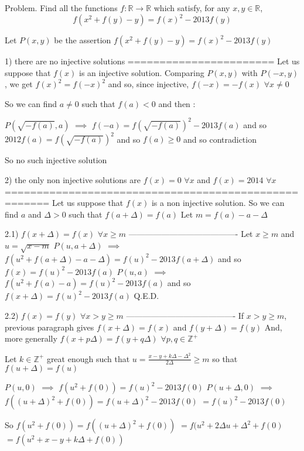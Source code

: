 \begin{solution}
	\begin{tcolorbox}Problem. Find all the functions $f:\mathbb{R}\rightarrow \mathbb{R}$ which satisfy, for any $x,y\in \mathbb{R}$, \[f\left ( x^{2}+f(y)-y \right )=f(x)^{2}-2013f(y)\]\end{tcolorbox}

Let $P(x,y)$ be the assertion $f(x^2+f(y)-y)=f(x)^2-2013f(y)$


1) there are no injective solutions
=======================
Let us suppose that $f(x)$ is an injective solution.
Comparing $P(x,y)$ with $P(-x,y)$, we get $f(x)^2=f(-x)^2$ and so, since injective, $f(-x)=-f(x)$ $\forall x\ne 0$

So we can find $a\ne 0$ such that $f(a)<0$  and then :

$P(\sqrt{-f(a)},a)$ $\implies$ $f(-a)=f(\sqrt{-f(a)})^2-2013f(a)$ and so $2012f(a)=f(\sqrt{-f(a)})^2$ and so $f(a)\ge 0$ and so contradiction

So no such injective solution

2) the only non injective solutions are $f(x)=0$ $\forall x$ and $f(x)=2014$ $\forall x$
=====================================================
Let us suppose that $f(x)$ is a non injective solution.
So we can find $a$ and $\Delta>0$ such that $f(a+\Delta)=f(a)$
Let $m=f(a)-a-\Delta$

2.1) $f(x+\Delta)=f(x)$ $\forall x\ge m$
----------------------------------------
Let $x\ge m$ and $u=\sqrt{x-m}$
$P(u,a+\Delta)$ $\implies$ $f(u^2+f(a+\Delta)-a-\Delta)=f(u)^2-2013f(a+\Delta)$ and so $f(x)=f(u)^2-2013f(a)$
$P(u,a)$ $\implies$ $f(u^2+f(a)-a)=f(u)^2-2013f(a)$ and so $f(x+\Delta)=f(u)^2-2013f(a)$
Q.E.D.

2.2) $f(x)=f(y)$ $\forall x>y\ge m$
----------------------------------------
If $x>y\ge m$, previous paragraph gives $f(x+\Delta)=f(x)$ and $f(y+\Delta)=f(y)$
And, more generally $f(x+p\Delta)=f(y+q\Delta)$ $\forall p,q\in\mathbb Z^+$

Let $k\in\mathbb Z^+$ great enough such that $u=\frac {x-y+k\Delta-\Delta^2}{2\Delta}\ge m$ so that $f(u+\Delta)=f(u)$

$P(u,0)$ $\implies$ $f(u^2+f(0))=f(u)^2-2013f(0)$
$P(u+\Delta,0)$ $\implies$ $f((u+\Delta)^2+f(0))=f(u+\Delta)^2-2013f(0)$ $=f(u)^2-2013f(0)$ 

So $f(u^2+f(0))=f((u+\Delta)^2+f(0))$ $=f(u^2+2\Delta u+\Delta^2+f(0)$ $=f(u^2+x-y+k\Delta+f(0))$


\end{solution}
